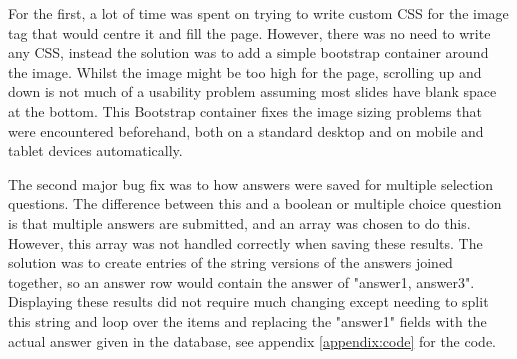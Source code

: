 For the first, a lot of time was spent on trying to write custom CSS for the image tag that would centre it and fill the page. However, there was no need to write any CSS, instead the solution was to add a simple bootstrap container around the image. Whilst the image might be too high for the page, scrolling up and down is not much of a usability problem assuming most slides have blank space at the bottom. This Bootstrap container fixes the image sizing problems that were encountered beforehand, both on a standard desktop and on mobile and tablet devices automatically.

The second major bug fix was to how answers were saved for multiple selection questions. The difference between this and a boolean or multiple choice question is that multiple answers are submitted, and an array was chosen to do this. However, this array was not handled correctly when saving these results. The solution was to create entries of the string versions of the answers joined together, so an answer row would contain the answer of "answer1, answer3". Displaying these results did not require much changing except needing to split this string and loop over the items and replacing the "answer1" fields with the actual answer given in the database, see appendix \ref{appendix:code} for the code.
\newpage